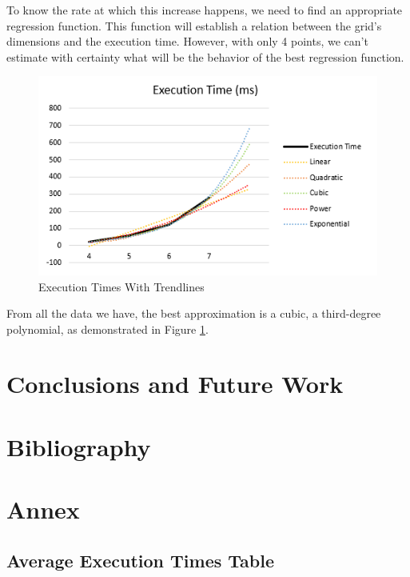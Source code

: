 \documentclass[runningheads]{llncs}
\begin{document}
To know the rate at which this increase happens, we need to find an appropriate regression function.
This function will establish a relation between the grid's dimensions and the execution time.
However, with only 4 points, we can't estimate with certainty what will be the behavior
    of the best regression function.

\begin{figure}
    \centering
    \includegraphics[scale=0.7]{img/dimensional_prediction.png}
    \caption{Execution Times With Trendlines} \label{fig6}
\end{figure}

From all the data we have, the best approximation is a cubic, a third-degree polynomial,
    as demonstrated in Figure \ref{fig6}.

\section{Conclusions and Future Work}

\section{Bibliography}

\section{Annex}

\subsection{Average Execution Times Table} \label{experiment-results}
\end{document}
